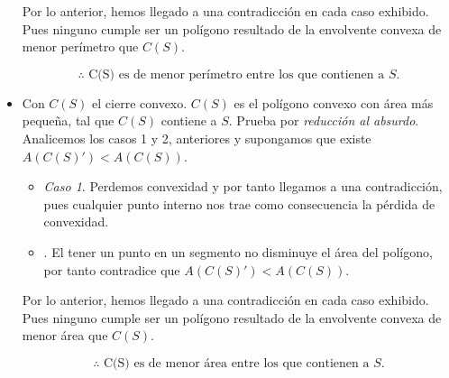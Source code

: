 \begin{itemize}
  Por lo anterior, hemos llegado a una contradicción en cada caso exhibido. Pues
  ninguno cumple ser un polígono resultado de la envolvente convexa de menor perímetro
  que $C(S)$.

  \[\therefore \text{ C(S) es de menor perímetro entre los que contienen a $S$.}\]
\item Con $C(S)$ el cierre convexo. $C(S)$ es el polígono convexo con área más pequeña, tal que
  $C(S)$ contiene a $S$.
  \newline
  Prueba por \textit{reducción al absurdo}. Analicemos los casos 1 y 2, anteriores y supongamos que
  existe $A(C(S)') < A(C(S))$.
  \begin{itemize}
  \item \textit{Caso 1}. Perdemos convexidad y por tanto llegamos a una contradicción, pues cualquier
    punto interno nos trae como consecuencia la pérdida de convexidad.
  \item {}. El tener un punto en un segmento no disminuye el área del polígono, por tanto
    contradice que $A(C(S)') < A(C(S))$.
  \end{itemize}
  Por lo anterior, hemos llegado a una contradicción en cada caso exhibido. Pues
  ninguno cumple ser un polígono resultado de la envolvente convexa de menor área
  que $C(S)$.

  \[\therefore \text{ C(S) es de menor área entre los que contienen a $S$.}\]
\end{itemize}
